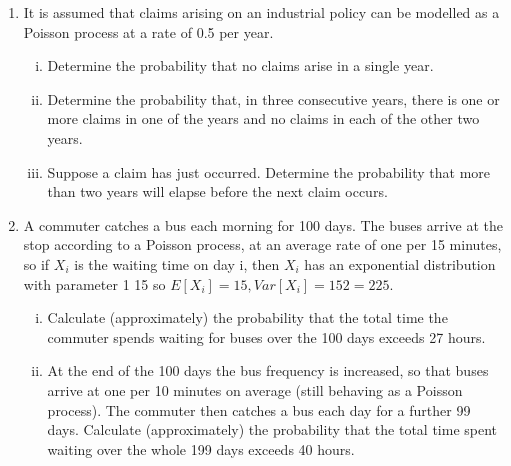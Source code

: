\documentclass[a4paper,12pt]{article}
\begin{document}
\begin{enumerate}
\item 

It is assumed that claims arising on an industrial policy can be modelled as a Poisson process at a rate of 0.5 per year.

\begin{enumerate}[(i)]
\item Determine the probability that no claims arise in a single year.

\item Determine the probability that, in three consecutive years, there is one or more
claims in one of the years and no claims in each of the other two years.

\item Suppose a claim has just occurred. Determine the probability that more than
two years will elapse before the next claim occurs.
\end{enumerate}
\item 
A commuter catches a bus each morning for 100 days. The buses arrive at the stop
according to a Poisson process, at an average rate of one per 15 minutes, so if $X_{i}$ is the
waiting time on day i, then $X_{i}$ has an exponential distribution with parameter
1
15
so
$E[X_{i} ] = 15, Var[X_{i} ] = 15 2 = 225.$

\begin{enumerate}[(i)]
\item Calculate (approximately) the probability that the total time the commuter spends waiting for buses over the 100 days exceeds 27 hours.

\item  At the end of the 100 days the bus frequency is increased, so that buses arrive at one per 10 minutes on average (still behaving as a Poisson process). The commuter then catches a bus each day for a further 99 days. Calculate
(approximately) the probability that the total time spent waiting over the
whole 199 days exceeds 40 hours.
\end{enumerate}

\end{enumerate}
\newpage
\end{document}
